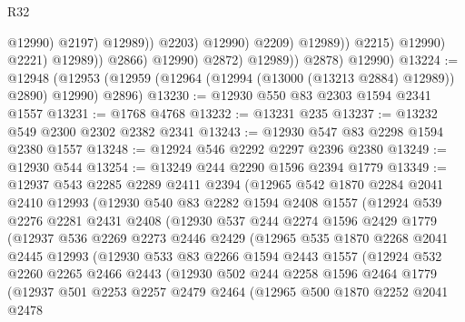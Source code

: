 \begin{lexlean}{R32}
\begin{coremodule}
                                              @12990)
                                            @2197)
                                          @12989))
                                      @2203)
                                    @12990)
                                  @2209)
                                @12989))
                            @2215)
                          @12990)
                        @2221)
                      @12989))
                  @2866)
                @12990)
              @2872)
            @12989))
        @2878)
      @12990)
@13224 := @12948
    (@12953 (@12959 (@12964 (@12994 (@13000 (@13213 @2884) @12989)) @2890) @12990) @2896)
@13230 := @12930 @550 @83 @2303 @1594 @2341 @1557
@13231 := @1768 @4768
@13232 := @13231 @235
@13237 := @13232 @549 @2300 @2302 @2382 @2341
@13243 := @12930 @547 @83 @2298 @1594 @2380 @1557
@13248 := @12924 @546 @2292 @2297 @2396 @2380
@13249 := @12930 @544
@13254 := @13249 @244 @2290 @1596 @2394 @1779
@13349 := @12937
    @543
    @2285
    @2289
    @2411
    @2394
    (@12965
      @542
      @1870
      @2284
      @2041
      @2410
      @12993
      (@12930
        @540
        @83
        @2282
        @1594
        @2408
        @1557
        (@12924
          @539
          @2276
          @2281
          @2431
          @2408
          (@12930
            @537
            @244
            @2274
            @1596
            @2429
            @1779
            (@12937
              @536
              @2269
              @2273
              @2446
              @2429
              (@12965
                @535
                @1870
                @2268
                @2041
                @2445
                @12993
                (@12930
                  @533
                  @83
                  @2266
                  @1594
                  @2443
                  @1557
                  (@12924
                    @532
                    @2260
                    @2265
                    @2466
                    @2443
                    (@12930
                      @502
                      @244
                      @2258
                      @1596
                      @2464
                      @1779
                      (@12937
                        @501
                        @2253
                        @2257
                        @2479
                        @2464
                        (@12965
                          @500
                          @1870
                          @2252
                          @2041
                          @2478

\end{coremodule}
\end{lexlean}
